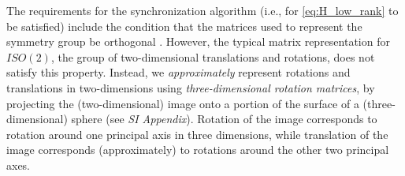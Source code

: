 \documentclass{pnastwo}
\begin{document}
\begin{article}
\begin{materials}
The requirements for the synchronization algorithm (i.e., for \eqref{eq:H_low_rank} to be satisfied) include the condition that the matrices used to represent the symmetry group be orthogonal \cite{singer2013spectral}.
%
However, the typical matrix representation for $ISO(2)$, the group of two-dimensional translations and rotations, does not satisfy this property.
%
Instead, we {\em approximately} represent rotations and translations in two-dimensions using {\em three-dimensional rotation matrices}, by projecting the (two-dimensional) image onto a portion of the surface of a (three-dimensional) sphere \cite{singer2011angular} (see {\it SI Appendix}).
%
Rotation of the image corresponds to rotation around one principal axis in three dimensions, while translation of the image corresponds (approximately) to rotations around the other two principal axes. %
%


\end{materials}
\end{article}
\end{document}
